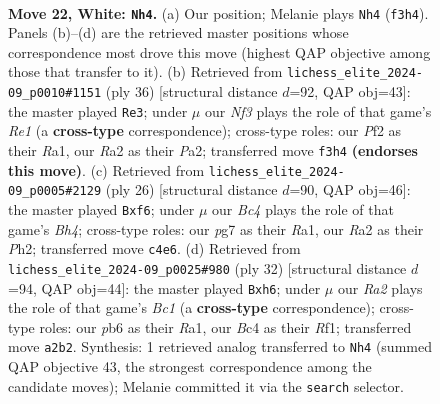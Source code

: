 \documentclass[11pt]{article}
\begin{document}
\clearpage

\begin{figure}[p]\centering
\begin{subfigure}{0.46\textwidth}\centering
\resizebox{\linewidth}{!}{%
\newchessgame
\chessboard[
  setfen={4r1k1/r3qpp1/np1p1n2/4p2p/P1B1P1b1/2N2NP1/R1PQ1P1P/2R3K1 w - - 5 22},
  showmover=false,
  pgfstyle=straightmove, color=movearrow, markmove={f3-h4}
]}
\caption{}
\end{subfigure}\hfill
\begin{subfigure}{0.46\textwidth}\centering
\resizebox{\linewidth}{!}{%
\newchessgame
\chessboard[
  setfen={r2r2k1/pp1qn1b1/3p1p2/3p1bp1/3P4/Q1P2NB1/PP1N1PP1/R3R1K1 w - - 2 19},
  showmover=false,
  pgfstyle=straightmove, color=movearrow, markmove={e1-e3}
]}
\caption{}
\end{subfigure}
\\[4pt]
\begin{subfigure}{0.46\textwidth}\centering
\resizebox{\linewidth}{!}{%
\newchessgame
\chessboard[
  setfen={2rqr1k1/ppp2pp1/5n1p/3pn3/1bPN3B/1PN1P3/P1Q2PPP/R3K2R w KQ - 0 14},
  showmover=false,
  pgfstyle=straightmove, color=movearrow, markmove={h4-f6}
]}
\caption{}
\end{subfigure}\hfill
\begin{subfigure}{0.46\textwidth}\centering
\resizebox{\linewidth}{!}{%
\newchessgame
\chessboard[
  setfen={r2q1rk1/p2pn1b1/1p4pp/3Pnp2/2P5/2N3PN/PP2Q2P/R1B2RK1 w - - 3 17},
  showmover=false,
  pgfstyle=straightmove, color=movearrow, markmove={c1-h6}
]}
\caption{}
\end{subfigure}
\caption{\textbf{Move 22, White: \texttt{Nh4}.} (a) Our position; Melanie plays \texttt{Nh4} (\texttt{f3h4}). Panels (b)--(d) are the retrieved master positions whose correspondence most drove this move (highest QAP objective among those that transfer to it). (b) Retrieved from \texttt{lichess\_elite\_2024-09\_p0010\#1151} (ply 36) [structural distance $d$=92, QAP obj=43]: the master played \texttt{Re3}; under $\mu$ our \emph{Nf3} plays the role of that game's \emph{Re1} (a \textbf{cross-type} correspondence); cross-type roles: our \emph{P}f2 as their \emph{R}a1, our \emph{R}a2 as their \emph{P}a2; transferred move \texttt{f3h4} \textbf{(endorses this move)}. (c) Retrieved from \texttt{lichess\_elite\_2024-09\_p0005\#2129} (ply 26) [structural distance $d$=90, QAP obj=46]: the master played \texttt{Bxf6}; under $\mu$ our \emph{Bc4} plays the role of that game's \emph{Bh4}; cross-type roles: our \emph{p}g7 as their \emph{R}a1, our \emph{R}a2 as their \emph{P}h2; transferred move \texttt{c4e6}. (d) Retrieved from \texttt{lichess\_elite\_2024-09\_p0025\#980} (ply 32) [structural distance $d$=94, QAP obj=44]: the master played \texttt{Bxh6}; under $\mu$ our \emph{Ra2} plays the role of that game's \emph{Bc1} (a \textbf{cross-type} correspondence); cross-type roles: our \emph{p}b6 as their \emph{R}a1, our \emph{B}c4 as their \emph{R}f1; transferred move \texttt{a2b2}. Synthesis: 1 retrieved analog transferred to \texttt{Nh4} (summed QAP objective 43, the strongest correspondence among the candidate moves); Melanie committed it via the \texttt{search} selector.}
\label{fig:thought-m42}
\end{figure}
\end{document}
